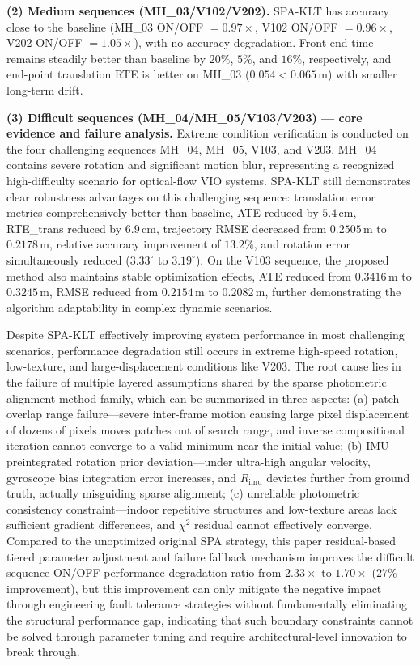 \documentclass[journal,twoside,web]{ieeecolor}
\begin{document}
\textbf{(2) Medium sequences (MH\_03/V102/V202).} SPA-KLT has accuracy close to the baseline (MH\_03 ON/OFF $=0.97\times$, V102 ON/OFF $=0.96\times$, V202 ON/OFF $=1.05\times$), with no accuracy degradation. Front-end time remains steadily better than baseline by $20\%$, $5\%$, and $16\%$, respectively, and end-point translation RTE is better on MH\_03 ($0.054 < 0.065\,$m) with smaller long-term drift.

\textbf{(3) Difficult sequences (MH\_04/MH\_05/V103/V203) --- core evidence and failure analysis.} Extreme condition verification is conducted on the four challenging sequences MH\_04, MH\_05, V103, and V203. MH\_04 contains severe rotation and significant motion blur, representing a recognized high-difficulty scenario for optical-flow VIO systems. SPA-KLT still demonstrates clear robustness advantages on this challenging sequence: translation error metrics comprehensively better than baseline, ATE reduced by $5.4\,\mathrm{cm}$, RTE\_trans reduced by $6.9\,\mathrm{cm}$, trajectory RMSE decreased from $0.2505\,$m to $0.2178\,$m, relative accuracy improvement of $13.2\%$, and rotation error simultaneously reduced ($3.33^{\circ}$ to $3.19^{\circ}$). On the V103 sequence, the proposed method also maintains stable optimization effects, ATE reduced from $0.3416\,$m to $0.3245\,$m, RMSE reduced from $0.2154\,$m to $0.2082\,$m, further demonstrating the algorithm adaptability in complex dynamic scenarios.

Despite SPA-KLT effectively improving system performance in most challenging scenarios, performance degradation still occurs in extreme high-speed rotation, low-texture, and large-displacement conditions like V203. The root cause lies in the failure of multiple layered assumptions shared by the sparse photometric alignment method family, which can be summarized in three aspects: (a) patch overlap range failure---severe inter-frame motion causing large pixel displacement of dozens of pixels moves patches out of search range, and inverse compositional iteration cannot converge to a valid minimum near the initial value; (b) IMU preintegrated rotation prior deviation---under ultra-high angular velocity, gyroscope bias integration error increases, and $R_{\mathrm{imu}}$ deviates further from ground truth, actually misguiding sparse alignment; (c) unreliable photometric consistency constraint---indoor repetitive structures and low-texture areas lack sufficient gradient differences, and $\chi^{2}$ residual cannot effectively converge. Compared to the unoptimized original SPA strategy, this paper residual-based tiered parameter adjustment and failure fallback mechanism improves the difficult sequence ON/OFF performance degradation ratio from $2.33\times$ to $1.70\times$ ($27\%$ improvement), but this improvement can only mitigate the negative impact through engineering fault tolerance strategies without fundamentally eliminating the structural performance gap, indicating that such boundary constraints cannot be solved through parameter tuning and require architectural-level innovation to break through.
\end{document}
